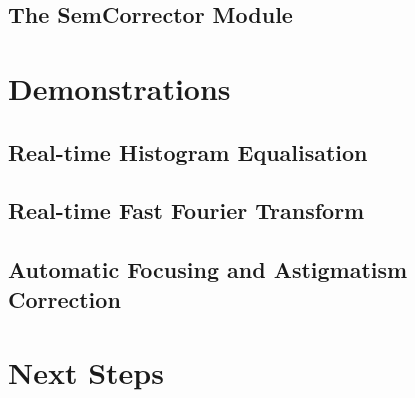 \documentclass{article}
\begin{document}
\subsection{The SemCorrector Module}

\section{Demonstrations}
\subsection{Real-time Histogram Equalisation}
\subsection{Real-time Fast Fourier Transform}
\subsection{Automatic Focusing and Astigmatism Correction}

\section{Next Steps}

\newpage
\begin{thebibliography}{}
\end{thebibliography}
\end{document}
